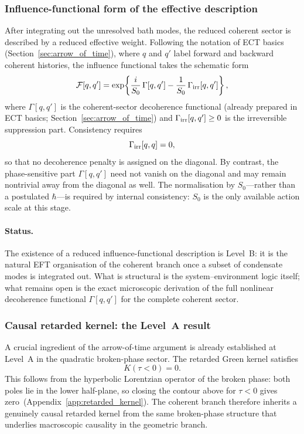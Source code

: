 \subsubsection*{Influence-functional form of the effective description}

After integrating out the unresolved bath modes, the reduced coherent
sector is described by a reduced effective weight.
Following the notation of ECT basics (Section~\ref{sec:arrow_of_time}),
where $q$ and $q'$ label forward and backward coherent histories, the
influence functional takes the schematic form
\begin{equation}
  \label{eq:qs_influence}
  \mathcal{F}[q,q']
  =
  \exp\!\left\{
    \frac{i}{S_0}\,\Gamma[q,q']
    - \frac{1}{S_0}\,\Gamma_{\rm irr}[q,q']
  \right\},
\end{equation}
where $\Gamma[q,q']$ is the coherent-sector decoherence functional
(already prepared in ECT basics; Section~\ref{sec:arrow_of_time})
and $\Gamma_{\rm irr}[q,q']\ge 0$ is the irreversible suppression
part. Consistency requires
\[
  \Gamma_{\rm irr}[q,q] = 0,
\]
so that no decoherence penalty is assigned on the diagonal.
By contrast, the phase-sensitive part $\Gamma[q,q']$ need not
vanish on the diagonal and may remain nontrivial away from the
diagonal as well.
The normalisation by $S_0$---rather than a postulated $\hbar$---is
required by internal consistency:
$S_0$ is the only available action scale at this stage.

\paragraph{Status.}
The existence of a reduced influence-functional description is Level~B:
it is the natural EFT organisation of the coherent branch once a
subset of condensate modes is integrated out.
What is structural is the system--environment logic itself;
what remains open is the exact microscopic derivation of
the full nonlinear decoherence functional $\Gamma[q,q']$
for the complete coherent sector.

\subsubsection*{Causal retarded kernel: the Level~A result}

A crucial ingredient of the arrow-of-time argument is already
established at Level~A in the quadratic broken-phase sector.
The retarded Green kernel satisfies
\begin{equation}
  \label{eq:qs_retarded_zero}
  K(\tau<0) = 0.
\end{equation}
This follows from the hyperbolic Lorentzian operator of the broken
phase: both poles lie in the lower half-plane, so closing the contour
above for $\tau<0$ gives zero~(Appendix~\ref{app:retarded_kernel}).
The coherent branch therefore inherits a genuinely causal retarded
kernel from the same broken-phase structure that underlies macroscopic
causality in the geometric branch.

